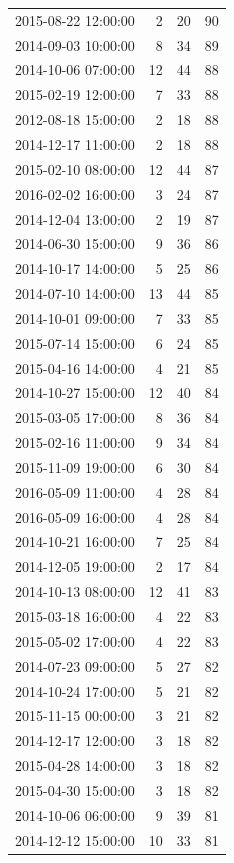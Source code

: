 \begin{tabular}{lrrr}
2015-08-22 12:00:00 & 2 & 20 & 90 \\
2014-09-03 10:00:00 & 8 & 34 & 89 \\
2014-10-06 07:00:00 & 12 & 44 & 88 \\
2015-02-19 12:00:00 & 7 & 33 & 88 \\
2012-08-18 15:00:00 & 2 & 18 & 88 \\
2014-12-17 11:00:00 & 2 & 18 & 88 \\
2015-02-10 08:00:00 & 12 & 44 & 87 \\
2016-02-02 16:00:00 & 3 & 24 & 87 \\
2014-12-04 13:00:00 & 2 & 19 & 87 \\
2014-06-30 15:00:00 & 9 & 36 & 86 \\
2014-10-17 14:00:00 & 5 & 25 & 86 \\
2014-07-10 14:00:00 & 13 & 44 & 85 \\
2014-10-01 09:00:00 & 7 & 33 & 85 \\
2015-07-14 15:00:00 & 6 & 24 & 85 \\
2015-04-16 14:00:00 & 4 & 21 & 85 \\
2014-10-27 15:00:00 & 12 & 40 & 84 \\
2015-03-05 17:00:00 & 8 & 36 & 84 \\
2015-02-16 11:00:00 & 9 & 34 & 84 \\
2015-11-09 19:00:00 & 6 & 30 & 84 \\
2016-05-09 11:00:00 & 4 & 28 & 84 \\
2016-05-09 16:00:00 & 4 & 28 & 84 \\
2014-10-21 16:00:00 & 7 & 25 & 84 \\
2014-12-05 19:00:00 & 2 & 17 & 84 \\
2014-10-13 08:00:00 & 12 & 41 & 83 \\
2015-03-18 16:00:00 & 4 & 22 & 83 \\
2015-05-02 17:00:00 & 4 & 22 & 83 \\
2014-07-23 09:00:00 & 5 & 27 & 82 \\
2014-10-24 17:00:00 & 5 & 21 & 82 \\
2015-11-15 00:00:00 & 3 & 21 & 82 \\
2014-12-17 12:00:00 & 3 & 18 & 82 \\
2015-04-28 14:00:00 & 3 & 18 & 82 \\
2015-04-30 15:00:00 & 3 & 18 & 82 \\
2014-10-06 06:00:00 & 9 & 39 & 81 \\
2014-12-12 15:00:00 & 10 & 33 & 81 \\

\end{tabular}
